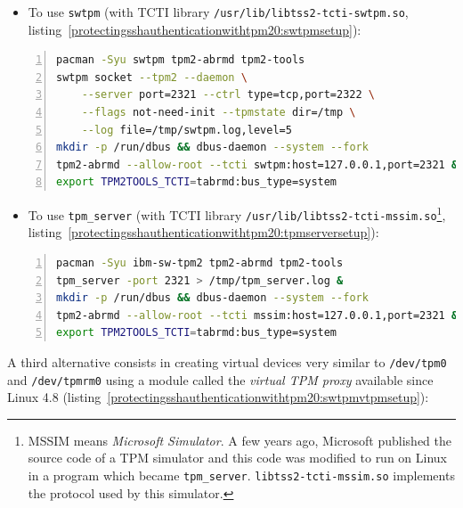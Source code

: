 \begin{itemize}

\item
  To use \texttt{swtpm} (with TCTI library
  \texttt{/usr/lib/libtss2-tcti-swtpm.so},
  listing~\ref{protectingsshauthenticationwithtpm20:swtpmsetup}):
\end{itemize}

\begin{lstlisting}[language=sh, numbers=left, caption={Install and launch a TPM 2.0 simulator on Arch Linux, with \texttt{swtpm}}, label=protectingsshauthenticationwithtpm20:swtpmsetup]
pacman -Syu swtpm tpm2-abrmd tpm2-tools
swtpm socket --tpm2 --daemon \
    --server port=2321 --ctrl type=tcp,port=2322 \
    --flags not-need-init --tpmstate dir=/tmp \
    --log file=/tmp/swtpm.log,level=5
mkdir -p /run/dbus && dbus-daemon --system --fork
tpm2-abrmd --allow-root --tcti swtpm:host=127.0.0.1,port=2321 &
export TPM2TOOLS_TCTI=tabrmd:bus_type=system
\end{lstlisting}

\begin{itemize}

\item
  To use \texttt{tpm\_server} (with TCTI library
  \texttt{/usr/lib/libtss2-tcti-mssim.so}\footnote{MSSIM
    means \emph{Microsoft Simulator}. A few years ago, Microsoft
    published the source code of a TPM simulator and this code was
    modified to run on Linux in a program which became
    \texttt{tpm\_server}.
    \texttt{libtss2-tcti-mssim.so} implements the
    protocol used by this simulator.},
  listing~\ref{protectingsshauthenticationwithtpm20:tpmserversetup}):
\end{itemize}

\begin{lstlisting}[language=sh, numbers=left, caption={Install and launch a TPM 2.0 simulator on Arch Linux, with \texttt{tpm\_server}}, label=protectingsshauthenticationwithtpm20:tpmserversetup]
pacman -Syu ibm-sw-tpm2 tpm2-abrmd tpm2-tools
tpm_server -port 2321 > /tmp/tpm_server.log &
mkdir -p /run/dbus && dbus-daemon --system --fork
tpm2-abrmd --allow-root --tcti mssim:host=127.0.0.1,port=2321 &
export TPM2TOOLS_TCTI=tabrmd:bus_type=system
\end{lstlisting}

A third alternative consists in creating virtual devices very similar to
\texttt{/dev/tpm0} and
\texttt{/dev/tpmrm0} using a module called the
\emph{virtual TPM proxy} available since Linux 4.8
(listing~\ref{protectingsshauthenticationwithtpm20:swtpmvtpmsetup}):


